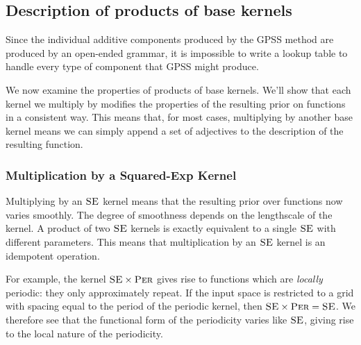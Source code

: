 \documentclass{article} %
\def\ie{i.e.\ }
\begin{document}
\subsection{Description of products of base kernels}
\vspace{-0.08in}

Since the individual additive components produced by the GPSS method are produced by an open-ended grammar, it is impossible to write a lookup table to handle every type of component that GPSS might produce.  



We now examine the properties of products of base kernels.  We'll show that each kernel we multiply by modifies the properties of the resulting prior on functions in a consistent way.  This means that, for most cases, multiplying by another base kernel means we can simply append a set of adjectives to the description of the resulting function.

\subsubsection{Multiplication by a Squared-Exp Kernel}
\vspace{-0.08in}

Multiplying by an ${\textsc{SE}}$ kernel means that the resulting prior over functions now varies smoothly.  The degree of smoothness depends on the lengthscale of the kernel.%
%
A product of two ${\textsc{SE}}$ kernels is exactly equivalent to a single ${\textsc{SE}}$ with different parameters.  This means that multiplication by an ${\textsc{SE}}$ kernel is an idempotent operation.  

For example,
the kernel ${\textsc{SE}} \times {\textsc{Per}}$ gives rise to functions which are \emph{locally} periodic: they only approximately repeat.
If the input space is restricted to a grid with spacing equal to the period of the periodic kernel, then ${\textsc{SE}} \times {\textsc{Per}} = {\textsc{SE}}$.
We therefore see that the functional form of the periodicity varies like ${\textsc{SE}}$, giving rise to the local nature of the periodicity.

\end{document}
